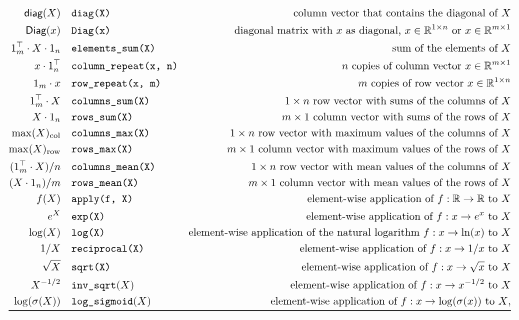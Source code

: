\documentclass{article}
\newcommand{\func}[1]{\ensuremath{\textsf{#1}}} %
\newcommand{\Reals}{\mathbb{R}}
\begin{document}
\begin{table}[H]
{\begin{align*}
    \func{diag}(X) &\quad \texttt{diag(X)} & \text{column vector that contains the diagonal of $X$} 
    \\
    \func{Diag}(x) &\quad \texttt{Diag(x)} &\quad \text{diagonal matrix with $x$ as diagonal, } x \in \Reals^{1 \times n} \text{ or } x \in \Reals^{m \times 1} 
    \\
    1_m^\top \cdot X \cdot 1_n &\quad \texttt{elements\_sum(X)} & \text{sum of the elements of $X$}
    \\
    x \cdot 1_n^\top &\quad \texttt{column\_repeat(x, n)} & \text{$n$ copies of column vector $x \in \Reals^{m \times 1}$} 
    \\
    1_m \cdot x &\quad \texttt{row\_repeat(x, m)} & \text{$m$ copies of row vector $x \in \Reals^{1 \times n}$}
    \\
    1_m^\top \cdot X &\quad \texttt{columns\_sum(X)} & \text{$1 \times n$ row vector with sums of the columns of $X$}
    \\
    X \cdot 1_n &\quad \texttt{rows\_sum(X)} & \text{$m \times 1$ column vector with sums of the rows of $X$} 
    \\
    \max(X)_\text{col} &\quad \texttt{columns\_max(X)} & \text{$1 \times n$ row vector with maximum values of the columns of $X$}
    \\
    \max(X)_\text{row} &\quad \texttt{rows\_max(X)} & \text{$m \times 1$ column vector with maximum values of the rows of $X$}
    \\
    (1_m^\top \cdot X) / n &\quad \texttt{columns\_mean(X)} & \text{$1 \times n$ row vector with mean values of the columns of $X$}
    \\
    (X \cdot 1_n) / m &\quad \texttt{rows\_mean(X)} & \text{$m \times 1$ column vector with mean values of the rows of $X$}
    \\
    f(X) &\quad \texttt{apply(f, X)} & \text{element-wise application of $f: \Reals \rightarrow \Reals$ to $X$} 
    \\
    e^X &\quad \texttt{exp(X)} & \text{element-wise application of $f: x \rightarrow e^x$ to $X$} 
    \\
    \log(X) &\quad \texttt{log(X)} & \text{element-wise application of the natural logarithm $f: x \rightarrow \ln(x)$ to $X$}
    \\
    1 / X &\quad \texttt{reciprocal(X)} & \text{element-wise application of $f: x \rightarrow 1/x$ to $X$}
    \\
    \sqrt{X} &\quad \texttt{sqrt(X)} & \text{element-wise application of $f: x \rightarrow \sqrt{x}$ to $X$}
    \\ X^{-1/2} &\quad \texttt{inv\_sqrt}(X) & \text{element-wise application of $f: x \rightarrow x^{-1/2}$ to $X$} 
    \\
    \log(\sigma(X)) &\quad \texttt{log\_sigmoid}(X) & \text{element-wise application of $f: x \rightarrow \log(\sigma(x))$ to $X$},
    \\
    \bottomrule
\end{align*}
}
\end{table}
\end{document}
